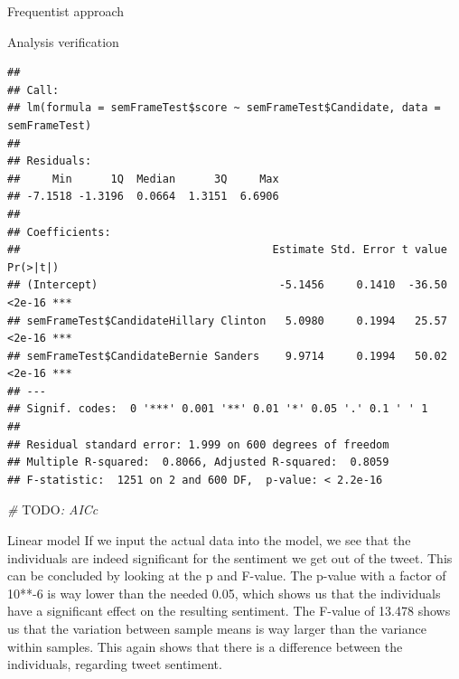 \documentclass[
  ignorenonframetext,
]{beamer}
\newenvironment{Shaded}{\begin{snugshade}}{\end{snugshade}}
\newcommand{\AlertTok}[1]{\textcolor[rgb]{0.94,0.16,0.16}{#1}}
\newcommand{\AttributeTok}[1]{\textcolor[rgb]{0.77,0.63,0.00}{#1}}
\newcommand{\CommentTok}[1]{\textcolor[rgb]{0.56,0.35,0.01}{\textit{#1}}}
\newcommand{\DecValTok}[1]{\textcolor[rgb]{0.00,0.00,0.81}{#1}}
\newcommand{\FunctionTok}[1]{\textcolor[rgb]{0.00,0.00,0.00}{#1}}
\newcommand{\NormalTok}[1]{#1}
\newcommand{\OtherTok}[1]{\textcolor[rgb]{0.56,0.35,0.01}{#1}}
\newcommand{\SpecialCharTok}[1]{\textcolor[rgb]{0.00,0.00,0.00}{#1}}
\begin{document}
\begin{frame}[fragile]{Frequentist approach}
\begin{block}{Analysis verification}
\begin{verbatim}
## 
## Call:
## lm(formula = semFrameTest$score ~ semFrameTest$Candidate, data = semFrameTest)
## 
## Residuals:
##     Min      1Q  Median      3Q     Max 
## -7.1518 -1.3196  0.0664  1.3151  6.6906 
## 
## Coefficients:
##                                       Estimate Std. Error t value Pr(>|t|)    
## (Intercept)                            -5.1456     0.1410  -36.50   <2e-16 ***
## semFrameTest$CandidateHillary Clinton   5.0980     0.1994   25.57   <2e-16 ***
## semFrameTest$CandidateBernie Sanders    9.9714     0.1994   50.02   <2e-16 ***
## ---
## Signif. codes:  0 '***' 0.001 '**' 0.01 '*' 0.05 '.' 0.1 ' ' 1
## 
## Residual standard error: 1.999 on 600 degrees of freedom
## Multiple R-squared:  0.8066, Adjusted R-squared:  0.8059 
## F-statistic:  1251 on 2 and 600 DF,  p-value: < 2.2e-16
\end{verbatim}

\begin{Shaded}
\begin{Highlighting}[]
\CommentTok{\# }\AlertTok{TODO}\CommentTok{: AICc}
\end{Highlighting}
\end{Shaded}
\end{block}

\begin{block}{Linear model}
\protect\hypertarget{linear-model}{}
If we input the actual data into the model, we see that the individuals
are indeed significant for the sentiment we get out of the tweet. This
can be concluded by looking at the p and F-value. The p-value with a
factor of 10**-6 is way lower than the needed 0.05, which shows us that
the individuals have a significant effect on the resulting sentiment.
The F-value of 13.478 shows us that the variation between sample means
is way larger than the variance within samples. This again shows that
there is a difference between the individuals, regarding tweet
sentiment.

\begin{Shaded}
\end{Shaded}


\end{block}
\end{frame}
\end{document}
